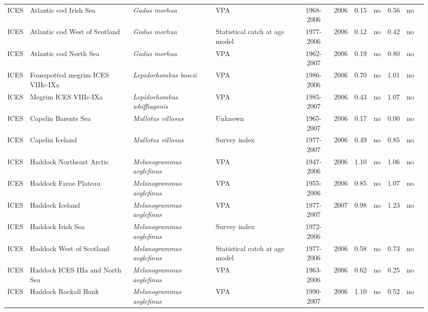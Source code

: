 \begin{longtable}{p{1.8cm}p{3.5cm}p{3.5cm}p{3cm}cccp{0.9cm}cp{0.9cm}c}
  ICES & Atlantic cod Irish Sea & \textit{Gadus morhua} & VPA & 1968-2006 & 2006 & 0.15 & no & 0.56 & no & \cite{ICES-WGNSDS-2007.pdf} \\ 
  ICES & Atlantic cod West of Scotland & \textit{Gadus morhua} & Statistical catch at age model & 1977-2006 & 2006 & 0.12 & no & 0.42 & no & \cite{ICES-WGNSDS-2007.pdf} \\ 
  ICES & Atlantic cod North Sea & \textit{Gadus morhua} & VPA & 1962-2007 & 2006 & 0.19 & no & 0.80 & no & \cite{ICES-WGNSSK-2007.pdf} \\ 
  ICES & Fourspotted megrim ICES VIIIc-IXa & \textit{Lepidorhombus boscii} & VPA & 1986-2006 & 2006 & 0.70 & no & 1.01 & no & \cite{ICES-WGHMM-2007.pdf} \\ 
  ICES & Megrim ICES VIIIc-IXa & \textit{Lepidorhombus whiffiagonis} & VPA & 1985-2007 & 2006 & 0.43 & no & 1.07 & no & \cite{ICES-WGHMM-2007.pdf} \\ 
  ICES & Capelin Barents Sea & \textit{Mallotus villosus} & Unknown & 1965-2007 & 2006 & 0.17 & no & 0.00 & no & \cite{ICES-AFWG-2007.pdf} \\ 
  ICES & Capelin Iceland & \textit{Mallotus villosus} & Survey index & 1977-2007 & 2006 & 0.49 & no & 0.85 & no & \cite{ICES-NWWG-2007.pdf} \\ 
  ICES & Haddock Northeast Arctic & \textit{Melanogrammus aeglefinus} & VPA & 1947-2006 & 2006 & 1.10 & no & 1.06 & no & \cite{ICES-AFWG-2007.pdf} \\ 
  ICES & Haddock Faroe Plateau & \textit{Melanogrammus aeglefinus} & VPA & 1955-2006 & 2006 & 0.85 & no & 1.07 & no & \cite{ICES-NWWG-2007.pdf} \\ 
  ICES & Haddock Iceland & \textit{Melanogrammus aeglefinus} & VPA & 1977-2007 & 2007 & 0.98 & no & 1.23 & no & \cite{ICES-NWWG-2007.pdf} \\ 
  ICES & Haddock Irish Sea & \textit{Melanogrammus aeglefinus} & Survey index & 1972-2006 &  &  &  &  &  & \cite{ICES-WGNSDS-2007.pdf} \\ 
  ICES & Haddock West of Scotland & \textit{Melanogrammus aeglefinus} & Statistical catch at age model & 1977-2006 & 2006 & 0.58 & no & 0.73 & no & \cite{ICES-WGNSDS-2007.pdf} \\ 
  ICES & Haddock ICES IIIa and North Sea & \textit{Melanogrammus aeglefinus} & VPA & 1963-2006 & 2006 & 0.62 & no & 0.25 & no & \cite{ICES-WGNSSK-2007.pdf} \\ 
  ICES & Haddock Rockall Bank & \textit{Melanogrammus aeglefinus} & VPA & 1990-2007 & 2006 & 1.10 & no & 0.52 & no & \cite{ICES-WGNSDS-2007.pdf} \\ 

\end{longtable}
